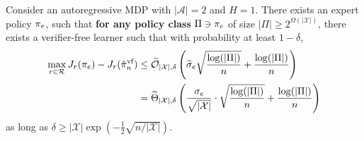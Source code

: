 \begin{theorem}
Consider an autoregressive MDP with $|\mathcal{A}| = 2$ and $H=1$. There exists an expert policy $\pi_e$, such that \textbf{for any policy class} $\Pi \ni \pi_e$ of size $|\Pi| \ge 2^{\Omega(|\mathcal{X}|)}$, there exists a verifier-free learner such that with probability at least $1-\delta$,
\begin{align*}
    \max_{r \in \mathcal{R}} J_r (\pi_e) - J_r (\hat{\pi}_n^{\text{vf}}) &\le \widetilde{{\mathcal{O}}}_{|\mathcal{X}|,\delta} \left( \widetilde{\sigma}_e \sqrt{\frac{\log (|\Pi|)}{n}} + \frac{\log(|\Pi|)}{n} \right) \\
    &= \widetilde{\Theta}_{|\mathcal{X}|,\delta} \left( \frac{\sigma_e}{\sqrt{|\mathcal{X}|} }\cdot \sqrt{\frac{\log (|\Pi|)}{n}} + \frac{\log(|\Pi|)}{n} \right)
\end{align*}
as long as $\delta \ge |\mathcal{X}|\exp ( - \frac{1}{2} \sqrt{n/|\mathcal{X}|})$.
\end{theorem}
